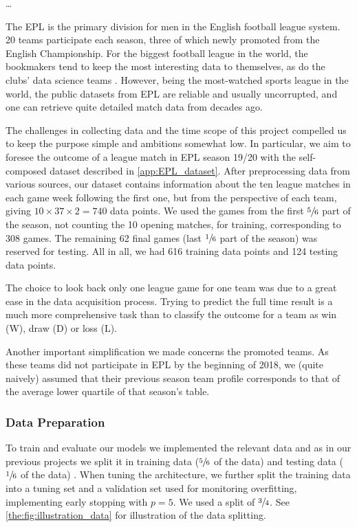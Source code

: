         \dots
        
        The EPL is the primary division for men in the English football league system. 20 teams participate each season, three of which newly promoted from the English Championship. For the biggest football league in the world, the bookmakers tend to keep the most interesting data to themselves, as do the clubs' data science teams \citep[Ch.~15]{Soccermatics}. However, being the most-watched sports league in the world, the public datasets from EPL are reliable and usually uncorrupted, and one can retrieve quite detailed match data from decades ago. 

        The challenges in collecting data and the time scope of this project compelled us to keep the purpose simple and ambitions somewhat low. In particular, we aim to foresee the outcome of a league match in EPL season 19/20 with the self-composed dataset described in \cref{app:EPL_dataset}. After preprocessing data from various sources, our dataset contains information about the ten league matches in each game week following the first one, but from the perspective of each team, giving $ 10 \times 37\times 2 = 740$ data points. We used the games from the first $\sfrac{5}{6}$ part of the season, not counting the 10 opening matches, for training, corresponding to 308 games. The remaining 62 final games (last $\sfrac{1}{6}$ part of the season) was reserved for testing. All in all, we had 616 training data points and 124 testing data points.
        
        The choice to look back only one league game for one team was due to a great ease in the data acquisition process. Trying to predict the full time result is a much more comprehensive task than to classify the outcome for a team as win (W), draw (D) or loss (L).

        Another important simplification we made concerns the promoted teams. As these teams did not participate in EPL by the beginning of 2018, we (quite naively) assumed that their previous season team profile corresponds to that of the average lower quartile of that season's table.  

        




    \subsubsection{Data Preparation}
        To train and evaluate our models we implemented the relevant data and as in our previous projects we split it in training data ($\sfrac{5}{6}$ of the data) and testing data ($\sfrac{1}{6}$ of the data) \citep{Project1, Project2}. When tuning the architecture, we further split the training data into a tuning set and a validation set used for monitoring overfitting, implementing early stopping with $p=5$. We used a split of $\sfrac{3}{4}$. See \cref{the:fig:illustration_data} for illustration of the data splitting. 

